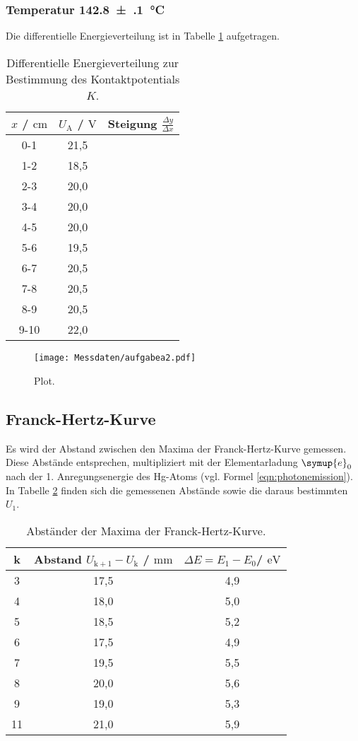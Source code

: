 \subsubsection{Temperatur \SI{142.8(1)}{\celsius}}
Die differentielle Energieverteilung ist in Tabelle \ref{tab:steigisdreieckslol} aufgetragen.
\begin{table}
	\centering
	\caption{Differentielle Energieverteilung zur Bestimmung des Kontaktpotentials $K$.}
	\label{tab:steigisdreieckslol}
	\begin{tabular}{ccc}
		\toprule
		$x$ / $\si{\centi\meter}$ & $U_{\mathrm{A}}$ / $\si{\volt}$ & Steigung $\frac{\Delta y}{\Delta x}$ \\
		\midrule
		0-1 & 21,5 \\
		1-2 & 18,5 \\
		2-3 & 20,0 \\
		3-4 & 20,0 \\
		4-5 & 20,0 \\
		5-6 & 19,5 \\
		6-7 & 20,5 \\
		7-8 & 20,5 \\
		8-9 & 20,5 \\
		9-10 & 22,0 \\
		\bottomrule
	\end{tabular}
\end{table}
\begin{figure}
	\centering
	\texttt{[image: Messdaten/aufgabea2.pdf]}
	\caption{Plot.}
	\label{fig:aufgabeA2}
\end{figure}





\FloatBarrier
\subsection{Franck-Hertz-Kurve}
Es wird der Abstand zwischen den Maxima der Franck-Hertz-Kurve gemessen. Diese Abstände entsprechen, multipliziert mit der Elementarladung $\symup{e}_0$ nach \cite{e} der 1. Anregungsenergie des Hg-Atoms (vgl. Formel \eqref{eqn:photonemission}).
In Tabelle \ref{tab:hertzchen} finden sich die gemessenen Abstände sowie die daraus bestimmten $U_\mathrm{1}$.
\begin{table}
	\centering
	\caption{Abständer der Maxima der Franck-Hertz-Kurve.}
	\label{tab:hertzchen}
	\begin{tabular}{ccc}
		\toprule
		k& Abstand $U_{\mathrm{k+1}}-U_{\mathrm{k}}$ / $\si{\milli\meter}$ & $\Delta E=E_1 - E_0$/ $\si{\electronvolt}$ \\
		\midrule
3&17,5 & 4,9\\
4&18,0 & 5,0\\
5&18,5 & 5,2\\
6&17,5 & 4,9\\
7&19,5 & 5,5\\
8&20,0 & 5,6\\
9&19,0 & 5,3\\
11&21,0 & 5,9\\
\bottomrule
\end{tabular}
\end{table}

